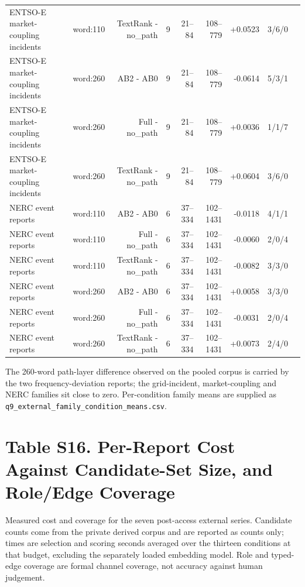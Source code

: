 \documentclass[11pt]{article}
\begin{document}
\begin{center}
{\begin{tabular}{llrrrrrrr}
ENTSO-E market-coupling incidents & word:110 & TextRank - no\_path & 9 & 21--84 & 108--779 & +0.0523 & 3/6/0\\
ENTSO-E market-coupling incidents & word:260 & AB2 - AB0 & 9 & 21--84 & 108--779 & -0.0614 & 5/3/1\\
ENTSO-E market-coupling incidents & word:260 & Full - no\_path & 9 & 21--84 & 108--779 & +0.0036 & 1/1/7\\
ENTSO-E market-coupling incidents & word:260 & TextRank - no\_path & 9 & 21--84 & 108--779 & +0.0604 & 3/6/0\\
NERC event reports & word:110 & AB2 - AB0 & 6 & 37--334 & 102--1431 & -0.0118 & 4/1/1\\
NERC event reports & word:110 & Full - no\_path & 6 & 37--334 & 102--1431 & -0.0060 & 2/0/4\\
NERC event reports & word:110 & TextRank - no\_path & 6 & 37--334 & 102--1431 & -0.0082 & 3/3/0\\
NERC event reports & word:260 & AB2 - AB0 & 6 & 37--334 & 102--1431 & +0.0058 & 3/3/0\\
NERC event reports & word:260 & Full - no\_path & 6 & 37--334 & 102--1431 & -0.0031 & 2/0/4\\
NERC event reports & word:260 & TextRank - no\_path & 6 & 37--334 & 102--1431 & +0.0073 & 2/4/0\\
\bottomrule
\end{tabular}}
\end{center}

The 260-word path-layer difference observed on the pooled corpus is carried by the two frequency-deviation reports; the grid-incident, market-coupling and NERC families sit close to zero. Per-condition family means are supplied as \nolinkurl{q9\_external\_family\_condition\_means.csv}.


\section*{Table S16. Per-Report Cost Against Candidate-Set Size, and Role/Edge Coverage}

Measured cost and coverage for the seven post-access external series. Candidate counts come from the private derived corpus and are reported as counts only; times are selection and scoring seconds averaged over the thirteen conditions at that budget, excluding the separately loaded embedding model. Role and typed-edge coverage are formal channel coverage, not accuracy against human judgement.
\end{document}
